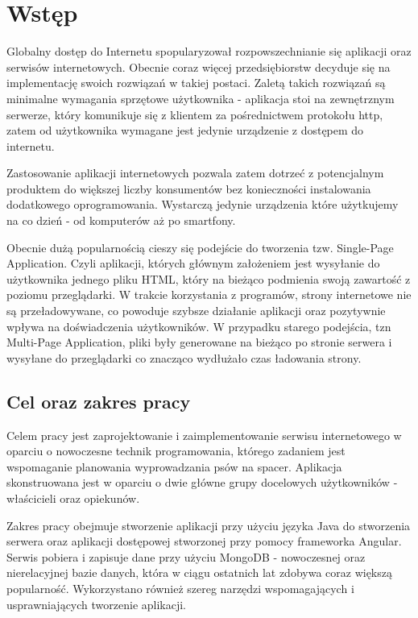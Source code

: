 \chapter{Wstęp}
Globalny dostęp do Internetu spopularyzował rozpowszechnianie się aplikacji oraz serwisów internetowych. Obecnie coraz więcej przedsiębiorstw decyduje się na implementację swoich rozwiązań w takiej postaci. Zaletą takich rozwiązań są minimalne wymagania sprzętowe użytkownika - aplikacja stoi na zewnętrznym serwerze, który komunikuje się z klientem za pośrednictwem protokołu http, zatem od użytkownika wymagane jest jedynie urządzenie z dostępem do internetu.

Zastosowanie aplikacji internetowych pozwala zatem dotrzeć z potencjalnym produktem do większej liczby konsumentów bez konieczności instalowania dodatkowego oprogramowania. Wystarczą jedynie urządzenia które użytkujemy na co dzień - od komputerów aż po smartfony.

Obecnie dużą popularnością cieszy się podejście do tworzenia tzw. Single-Page Application. Czyli aplikacji, których głównym założeniem jest wysyłanie do użytkownika jednego pliku HTML, który na bieżąco podmienia swoją zawartość z poziomu przeglądarki. W trakcie korzystania z programów, strony internetowe nie są przeładowywane, co powoduje szybsze działanie aplikacji oraz pozytywnie wpływa na doświadczenia użytkowników. W przypadku starego podejścia, tzn Multi-Page Application, pliki były generowane na bieżąco po stronie serwera i wysyłane do przeglądarki co znacząco wydłużało czas ładowania strony.
\section{Cel oraz zakres pracy}
Celem pracy jest zaprojektowanie i zaimplementowanie serwisu internetowego w oparciu o  nowoczesne technik programowania, którego zadaniem jest wspomaganie planowania wyprowadzania psów na spacer. Aplikacja skonstruowana jest w oparciu o dwie główne grupy docelowych użytkowników - właścicieli oraz opiekunów. 

Zakres pracy obejmuje stworzenie aplikacji przy użyciu języka Java do stworzenia serwera oraz aplikacji dostępowej stworzonej przy pomocy frameworka Angular. Serwis pobiera i zapisuje dane przy użyciu MongoDB - nowoczesnej oraz nierelacyjnej bazie danych, która w ciągu ostatnich lat zdobywa coraz większą popularność. Wykorzystano również szereg narzędzi wspomagających i usprawniających tworzenie aplikacji.

\newpage
